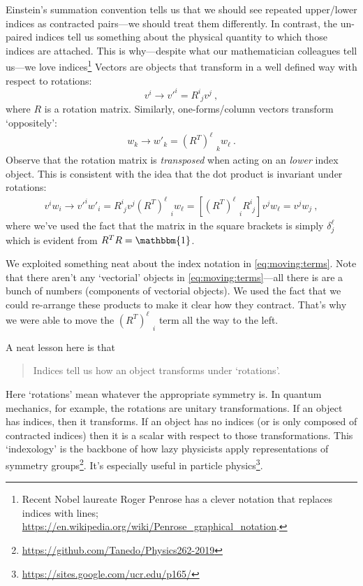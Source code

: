 Einstein's summation convention tells us that we should see repeated upper/lower indices as contracted pairs---we should treat them differently. In contrast, the un-paired indices tell us something about the physical quantity to which those indices are attached. This is why---despite what our mathematician colleagues tell us---we love indices\footnote{Recent Nobel laureate Roger Penrose has a clever notation that replaces indices with lines; \url{https://en.wikipedia.org/wiki/Penrose_graphical_notation}.} Vectors are objects that transform in a well defined way with respect to rotations: $$v^i \to v'^i = R^i_{\phantom{i}j}v^j \ , $$ where $R$ is a rotation matrix. Similarly, one-forms/column vectors transform `oppositely': 
\begin{align}
  w_k \to w'_k = \left(R^T\right)^\ell_{\phantom{\ell}k}w_\ell \ .
\end{align}
Observe that the rotation matrix is \emph{transposed} when acting on an \emph{lower} index object.
%
This is consistent with the idea that the dot product is invariant under rotations:
\begin{align}
  v^i w_i 
  \to 
  v'^i w'_i 
  =R^i_{\phantom{i}j}v^j \left(R^T\right)^\ell_{\phantom{\ell}i}w_\ell
  = \left[\left(R^T\right)^\ell_{\phantom{\ell}i} R^i_{\phantom{i}j}\right] v^j w_\ell
  = v^j w_j \ ,
  \label{eq:moving:terms}
\end{align}
where we've used the fact that the matrix in the square brackets is simply $\delta^\ell_j$ which is evident from $R^TR = \mathbbm{1}$.
\begin{example}
We exploited something neat about the index notation in \eqref{eq:moving:terms}. Note that there aren't any `vectorial' objects in \eqref{eq:moving:terms}---all there is are a bunch of numbers (components of vectorial objects). We used the fact that we could re-arrange these products to make it clear how they contract. That's why we were able to move the $(R^T)^\ell_{\phantom{\ell}i}$ term all the way to the left. 
\end{example}
A neat lesson here is that
\begin{quote}
Indices tell us how an object transforms under `rotations'.
\end{quote}
Here `rotations' mean whatever the appropriate symmetry is. In quantum mechanics, for example, the rotations are unitary transformations. If an object has indices, then it transforms. If an object has no indices (or is only composed of contracted indices) then it is a scalar with respect to those transformations. 
%
This `indexology' is the backbone of how lazy physicists apply representations of symmetry groups\footnote{\url{https://github.com/Tanedo/Physics262-2019}}. It's especially useful in particle physics\footnote{\url{https://sites.google.com/ucr.edu/p165/}}.

